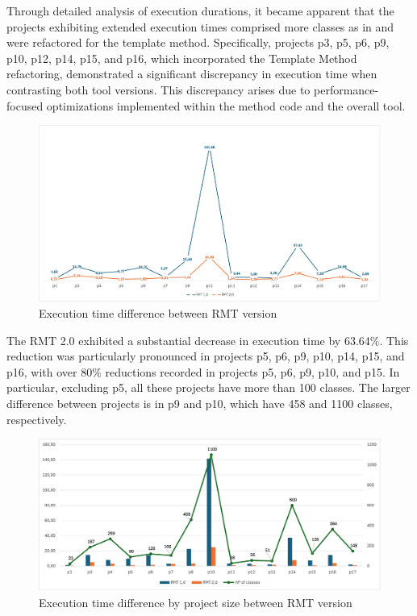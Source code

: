 

Through detailed analysis of execution durations, it became apparent that the projects exhibiting extended execution times comprised more classes as in  and were refactored for the template method. Specifically, projects p3, p5, p6, p9, p10, p12, p14, p15, and p16, which incorporated the Template Method refactoring, demonstrated a significant discrepancy in execution time when contrasting both tool versions. This discrepancy arises due to performance-focused optimizations implemented within the method code and the overall tool.

\begin{figure}[ht!]
\caption{Execution time difference between RMT version}
\label{fig-time-chart}
\includegraphics[width =\textwidth]{Chapter-5/Figures/time-diff.png}
\end{figure}
\FloatBarrier

The RMT 2.0 exhibited a substantial decrease in execution time by 63.64\%. This reduction was particularly pronounced in projects p5, p6, p9, p10, p14, p15, and p16, with over 80\% reductions recorded in projects p5, p6, p9, p10, and p15. In particular, excluding p5, all these projects have more than 100 classes. The larger difference between projects is in p9 and p10, which have 458 and 1100 classes, respectively. 

\begin{figure}[ht!]
\caption{Execution time difference by project size between RMT version}
\label{fig-time-by-size}
\includegraphics[width =\textwidth]{Chapter-5/Figures/time-per-project-size.png}
\end{figure}
\FloatBarrier

